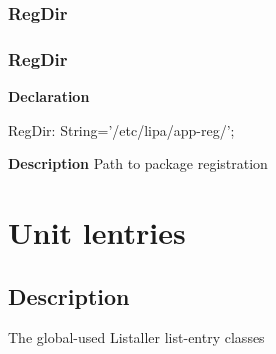 \documentclass{report}
\newif\ifpdf
\begin{document}
\subsection*{\large{\textbf{RegDir}}\normalsize\hspace{1ex}\hrulefill}
\else
\subsection*{RegDir}
\fi
\label{ipkhandle-RegDir}
\begin{list}{}{
\setlength{\itemindent}{0cm}
\setlength{\listparindent}{0cm}
\setlength{\leftmargin}{\evensidemargin}
\addtolength{\leftmargin}{\tmplength}
\settowidth{\labelsep}{X}
\addtolength{\leftmargin}{\labelsep}
\setlength{\labelwidth}{\tmplength}
}
\item[\textbf{Declaration}\hfill]
\ifpdf
\begin{flushleft}
\fi
\begin{ttfamily}
RegDir: String='/etc/lipa/app-reg/';\end{ttfamily}

\ifpdf
\end{flushleft}
\fi

\par
\item[\textbf{Description}]
Path to package registration

\end{list}
\chapter{Unit lentries}
\label{lentries}
\section{Description}
The global{-}used Listaller list{-}entry classes
\end{document}
